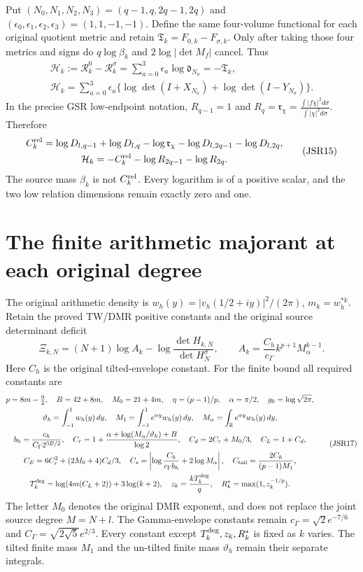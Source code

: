 \documentclass[11pt,a4paper]{article}
\newcommand{\R}{\mathbb R}
\begin{document}
Put $(N_0,N_1,N_2,N_3)=(q-1,q,2q-1,2q)$ and
$(\epsilon_0,\epsilon_1,\epsilon_2,\epsilon_3)=(1,1,-1,-1)$.
Define the same four-volume functional for each original
quotient metric and retain
$\mathfrak T_k=F_{0,k}-F_{\sigma,k}$.
Only after taking those four metrics and signs do
$q\log\beta_k$ and $2\log|\det M_f|$ cancel. Thus
\[
\begin{gathered}
 \mathcal H_k:=\mathcal R_k^0-\mathcal R_k^\sigma
 =\sum_{a=0}^3\epsilon_a\log\mathfrak d_{N_a}
 =-\mathfrak T_k,\\
 \mathcal H_k=\sum_{a=0}^3\epsilon_a
       \{\log\det(I+X_{N_a})+\log\det(I-Y_{N_a})\}.
\end{gathered}\tag{JSR14}
\]
In the precise GSR low-endpoint notation,
$R_{q-1}=1$ and
$R_q=\mathfrak r_\chi=
\frac{\int|f\chi|^2d\sigma}{\int|\chi|^2d\sigma}$.
Therefore
\[
\begin{gathered}
 C_k^{\rm rel}=\log D_{l,q-1}+\log D_{l,q}
   -\log\mathfrak r_\chi-\log D_{l,2q-1}-\log D_{l,2q},\\
 \mathcal H_k=-C_k^{\rm rel}-\log R_{2q-1}-\log R_{2q}.
\end{gathered}\tag{JSR15}
\]
The source mass $\beta_k$ is not $C_k^{\rm rel}$.
Every logarithm is of a positive scalar, and the two low
relation dimensions remain exactly zero and one.

\section{The finite arithmetic majorant at each original degree}

The original arithmetic density is
$w_h(y)=|v_h(1/2+iy)|^2/(2\pi)$, $m_k=w_h^{*k}$.
Retain the proved TW/DMR positive constants and the original
source determinant deficit
\[
 \Xi_{k,N}=(N+1)\log A_k
       -\log\frac{\det H_{k,N}}{\det H_N^\sigma},\qquad
 A_k=\frac{C_h}{c_\Gamma}k^{p+1}M_\alpha^{k-1}.
 \tag{JSR16}
\]
Here $C_h$ is the original tilted-envelope constant. For the
finite bound all required constants are
\[
\begin{gathered}
 p=8m-\tfrac92,\quad B=42+8m,\quad M_0=21+4m,\quad
 \eta=(p-1)/p,\quad\alpha=\pi/2,\quad g_0=\log\sqrt{2\pi},\\
 \vartheta_h=\int_{-1}^1w_h(y)\,dy,\quad
 M_1=\int_{-1}^1e^{\alpha y}w_h(y)\,dy,\quad
 M_\alpha=\int_{\R}e^{\alpha y}w_h(y)\,dy,\\
 b_h=\frac{c_h}{C_\Gamma2^{3B/2}},\quad
 C_r=1+\frac{\alpha+\log(M_\alpha/\vartheta_h)+B}{\log2},\quad
 C_d=2C_r+M_0/3,\quad C_L=1+C_d,\\
 C_E=6C_r^2+(2M_0+4)C_d/3,\quad
 C_s=\left|\log\frac{C_h}{c_\Gamma b_h}+2\log M_\alpha\right|,
 \quad C_{\rm tail}=\frac{2C_h}{(p-1)M_1},\\
 T_k^{\rm deg}=\log(4m(C_L+2))+3\log(k+2),\quad
 z_k=\frac{kT_k^{\rm deg}}q,\quad R_k^*=\max(1,z_k^{-1/p}).
\end{gathered}\tag{JSR17}
\]
The letter $M_0$ denotes the original DMR exponent, and does
not replace the joint source degree $M=N+l$.
The Gamma-envelope constants remain
$c_\Gamma=\sqrt2e^{-7/6}$ and
$C_\Gamma=\sqrt{2\sqrt5}e^{2/3}$.
Every constant except $T_k^{\rm deg},z_k,R_k^*$ is fixed
as $k$ varies. The tilted finite mass $M_1$ and the
un-tilted finite mass $\vartheta_h$ remain their separate integrals.
\end{document}
